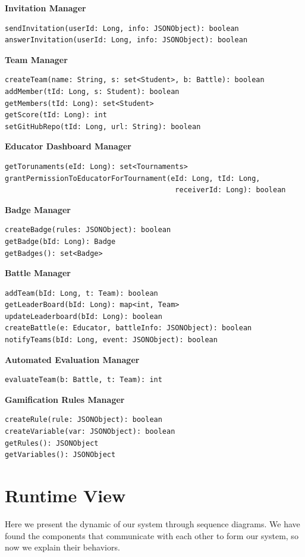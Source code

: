 \textbf{Invitation Manager}
\begin{verbatim}
sendInvitation(userId: Long, info: JSONObject): boolean
answerInvitation(userId: Long, info: JSONObject): boolean
\end{verbatim}

\textbf{Team Manager}
\begin{verbatim}
createTeam(name: String, s: set<Student>, b: Battle): boolean
addMember(tId: Long, s: Student): boolean
getMembers(tId: Long): set<Student>
getScore(tId: Long): int
setGitHubRepo(tId: Long, url: String): boolean
\end{verbatim}

\textbf{Educator Dashboard Manager}
\begin{verbatim}
getTorunaments(eId: Long): set<Tournaments>
grantPermissionToEducatorForTournament(eId: Long, tId: Long, 
                                        receiverId: Long): boolean
\end{verbatim}

\textbf{Badge Manager}
\begin{verbatim}
createBadge(rules: JSONObject): boolean
getBadge(bId: Long): Badge
getBadges(): set<Badge>
\end{verbatim}

\textbf{Battle Manager}
\begin{verbatim}
addTeam(bId: Long, t: Team): boolean
getLeaderBoard(bId: Long): map<int, Team>
updateLeaderboard(bId: Long): boolean
createBattle(e: Educator, battleInfo: JSONObject): boolean
notifyTeams(bId: Long, event: JSONObject): boolean
\end{verbatim}

\textbf{Automated Evaluation Manager}
\begin{verbatim}
evaluateTeam(b: Battle, t: Team): int
\end{verbatim}

\textbf{Gamification Rules Manager}
\begin{verbatim}
createRule(rule: JSONObject): boolean
createVariable(var: JSONObject): boolean
getRules(): JSONObject
getVariables(): JSONObject
\end{verbatim}


    



\section{Runtime View}
\label{sec:runtime_view}%
Here we present the dynamic of our system through sequence diagrams.
We have found the components that communicate with each other to form our system, so now we explain their behaviors.

